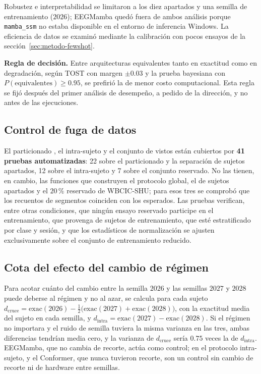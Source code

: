 Robustez e interpretabilidad se limitaron a los diez apartados y una semilla de entrenamiento ($2026$); EEGMamba quedó fuera de ambos análisis porque \texttt{mamba\_ssm} no estaba disponible en el entorno de inferencia Windows. La eficiencia de datos se examinó mediante la calibración con pocos ensayos de la sección~\ref{sec:metodo-fewshot}.

\textbf{Regla de decisión.} Entre arquitecturas equivalentes tanto en exactitud \loso{} como en degradación, según TOST con margen $\pm 0.03$ y la prueba bayesiana con $P(\text{equivalentes})\geq 0.95$, se prefirió la de menor costo computacional. Esta regla se fijó después del primer análisis de desempeño, a pedido de la dirección, y no antes de las ejecuciones.

\subsection{Control de fuga de datos}

El particionado \loso{}, el intra-sujeto y el conjunto de vistos están cubiertos por
\textbf{41 pruebas automatizadas}: 22
sobre el particionado \loso{} y la separación de sujetos apartados, 12 sobre el
intra-sujeto y 7 sobre el conjunto reservado. No las tienen, en cambio, las funciones que
construyen el protocolo global, el de sujetos apartados y el $20$\,\% reservado de
WBCIC-SHU; para esos tres se comprobó que los recuentos de segmentos coinciden con los
esperados. Las pruebas verifican, entre otras condiciones, que ningún ensayo reservado
participe en el entrenamiento, que provenga de sujetos de entrenamiento, que
esté estratificado por clase y sesión, y que los estadísticos de normalización
se ajusten exclusivamente sobre el conjunto de entrenamiento reducido.

\subsection{Cota del efecto del cambio de régimen}
\label{sec:cota-confusor}

Para acotar cuánto del cambio entre la semilla $2026$ y las semillas $2027$ y $2028$ puede
deberse al régimen y no al azar, se calcula para cada sujeto $d_{\mathrm{cruce}} =
\mathrm{exac}(2026) - \tfrac12\bigl(\mathrm{exac}(2027) + \mathrm{exac}(2028)\bigr)$, con la
exactitud media del sujeto en cada semilla, y $d_{\mathrm{intra}} = \mathrm{exac}(2027) -
\mathrm{exac}(2028)$. Si el régimen no importara y el ruido de semilla tuviera la misma
varianza en las tres, ambas diferencias tendrían media cero, y la varianza de
$d_{\mathrm{cruce}}$ sería $0.75$ veces la de $d_{\mathrm{intra}}$. EEGMamba, que no cambia de
recorte, actúa como control; en el protocolo intra-sujeto, \eegnet{} y el Conformer, que
nunca tuvieron recorte, son un control sin cambio de recorte ni de hardware entre
semillas.

